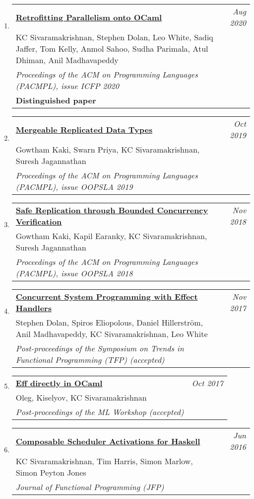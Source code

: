 \documentclass[10pt]{article}
\makeatletter
\newcommand{\lbar}[1]{{\color{#1}\ding{118}}\hspace*{2pt}}
\newenvironment{benumerate}[2]{
    \let\oldItem\item
    \def\item{\addtocounter{enumi}{-2}\oldItem}
    \begin{enumerate}[#2] \itemsep3pt
    \setcounter{enumi}{#1}
    \addtocounter{enumi}{1}}
  {\end{enumerate}}
\newenvironment{publication}[5]
{ \item
  \begin{tabular*}{7.5in}{p{6.3in}@{\extracolsep{\fill}}r}
    \href{#1}{\textbf{#2}} & \textit{#3}\\ #4 &\\ \textit{#5}&\\
  \end{tabular*}
} {}
\newenvironment{publicationNote}[6]
{ \item
  \begin{tabular*}{7.5in}{p{6.3in}@{\extracolsep{\fill}}r}
    \href{#1}{\textbf{#2}} & \textit{#3}\\ #4 &\\ \textit{#5}\\ \textbf{#6} \\
  \end{tabular*}
} {}
\newenvironment{region}[3]{%
  \vspace*{0.5ex}
  {\scalebox{1.4}{\textbf{#1}}}
  \begin{benumerate}{#3}{\color{RoyalBlue}#2}}
  {\end{benumerate}\vspace{0.8ex}}
\makeatother
\begin{document}
\begin{region} {\lbar{purple}Journal Publications}{{J}1}{9}

	\begin{publicationNote}{https://kcsrk.info/papers/retro-parallel_icfp_20.pdf}
		{Retrofitting Parallelism onto OCaml}
		{Aug 2020}{KC Sivaramakrishnan, Stephen Dolan, Leo White, Sadiq Jaffer, Tom Kelly, Anmol Sahoo, Sudha Parimala, Atul Dhiman, Anil Madhavapeddy}
		{Proceedings of the ACM on Programming Languages (PACMPL), issue ICFP 2020}
		{Distinguished paper}
	\end{publicationNote}

	\begin{publication}{http://kcsrk.info/papers/oopsla19-mrdt.pdf}
		{Mergeable Replicated Data Types}
    {Oct 2019}{Gowtham Kaki, Swarn Priya, KC Sivaramakrishnan, Suresh Jagannathan}
		{Proceedings of the ACM on Programming Languages (PACMPL), issue OOPSLA 2019}
  \end{publication}

	\begin{publication}{http://kcsrk.info/papers/oopsla18-q9.pdf}
		{Safe Replication through Bounded Concurrency Verification}
    {Nov 2018}{Gowtham Kaki, Kapil Earanky, KC Sivaramakrishnan, Suresh Jagannathan}
		{Proceedings of the ACM on Programming Languages (PACMPL), issue OOPSLA 2018}
  \end{publication}

  \begin{publication}{http://kcsrk.info/papers/system_effects_feb_18.pdf}
    {Concurrent System Programming with Effect Handlers}
    {Nov 2017}{Stephen Dolan, Spiros Eliopolous, Daniel Hillerström, Anil Madhavapeddy, KC Sivaramakrishnan, Leo White}
    {Post-proceedings of the Symposium on Trends in Functional Programming (TFP) (accepted)}
  \end{publication}

  \begin{publication}{http://kcsrk.info/papers/caml-eff17.pdf}
    {Eff directly in OCaml}
    {Oct 2017}{Oleg, Kiselyov, KC Sivaramakrishnan}
    {Post-proceedings of the ML Workshop (accepted)}
  \end{publication}

  \begin{publication}{http://kcsrk.info/papers/schedact_jfp15.pdf}
    {Composable Scheduler Activations for Haskell}
    {Jun 2016}{KC Sivaramakrishnan, Tim Harris, Simon Marlow, Simon Peyton Jones}
    {Journal of Functional Programming (JFP)}
  \end{publication}


\end{region}
\end{document}
